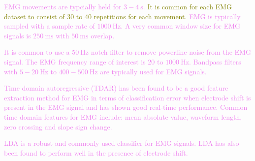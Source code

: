 \textcolor{violet}{EMG movements are typcially held for $3-4\:\text{s}$\:\cite{youngClassificationSimultaneousMovements2013}\cite{liQuantifyingPatternRecognition2010}\cite{youngImprovingMyoelectricPattern2012}.}
\textcolor{olive}{It is common for each EMG dataset to consist of $30$ to $40$ repetitions for each movement\:\cite{severiniEffectSNRNormalization2018}\cite{turgunovNewDatasetDetection2020}.}
\textcolor{violet}{EMG is typically sampled with a sample rate of $1000\:\text{Hz}$\:\cite{youngClassificationSimultaneousMovements2013}\cite{liQuantifyingPatternRecognition2010}\cite{youngImprovingMyoelectricPattern2012}\cite{vidovicImprovingRobustnessMyoelectric2016}.}
\textcolor{violet}{A very common window size for EMG signals is $250\:\text{ms}$ with $50\:\text{ms}$ overlap\:\cite{youngClassificationSimultaneousMovements2013}\cite{youngImprovingMyoelectricPattern2012}\cite{vidovicImprovingRobustnessMyoelectric2016}.}

\textcolor{violet}{It is common to use a $50\:\text{Hz}$ notch filter to remove powerline noise from the EMG signal\:\cite{vidovicImprovingRobustnessMyoelectric2016}.}
\textcolor{violet}{The EMG frequency range of interest is $20$ to $1000\:\text{Hz}$\:\cite{islamSignalArtifactsTechniques2021}.}
\textcolor{violet}{Bandpass filters with $5-20\:\text{Hz}$ to $400-500\:\text{Hz}$ are typically used for EMG signals\:\cite{liQuantifyingPatternRecognition2010}\cite{vidovicImprovingRobustnessMyoelectric2016}.}

\textcolor{violet}{Time domain autoregressive (TDAR) has been found to be a good feature extraction method for EMG in terms of classification error when electrode shift is present in the EMG signal and has shown good real-time performance\:\cite{youngImprovingMyoelectricPattern2012}.}
\textcolor{violet}{Common time domain features for EMG include: mean absolute value, waveform length, zero crossing and slope sign change\:\cite{zhangEEGEMGEOGBased2019}\cite{youngClassificationSimultaneousMovements2013}\cite{liQuantifyingPatternRecognition2010}.}

\textcolor{violet}{LDA is a robust and commonly used classifier for EMG signals\:\cite{liQuantifyingPatternRecognition2010}\cite{youngImprovingMyoelectricPattern2012}\cite{vidovicImprovingRobustnessMyoelectric2016}. LDA has also been found to perform well in the presence of electrode shift\:\cite{youngImprovingMyoelectricPattern2012}.}


